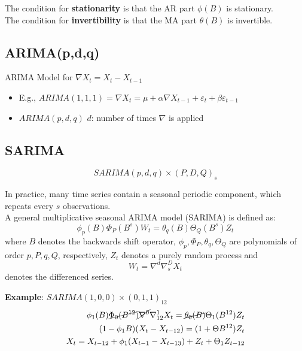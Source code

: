 The condition for \textbf{stationarity} is that the AR part $\phi(B)$ is stationary.\\
The condition for \textbf{invertibility} is that the MA part $\theta(B)$ is invertible.

\subsection{ARIMA(p,d,q)}

ARIMA Model for \(\nabla X_t=X_t-X_{t-1}\)
\begin{itemize}
    \item[] E.g., \( ARIMA(1,1,1)=\nabla X_t=\mu +\alpha \nabla X_{t-1} + \varepsilon_t + \beta \varepsilon_{t-1} \)
    \item $ARIMA(p,d,q)$ \quad $d$: number of times $\nabla$ is applied
\end{itemize}

\subsection{SARIMA}

\[SARIMA(p,d,q) \times (P,D,Q)_s\]

In practice, many time series contain a seasonal periodic component, which repeats every $s$ observations. \\

A general multiplicative seasonal ARIMA model (SARIMA) is defined as: \[
\phi_p(B) \Phi_P(B^s)W_t = \theta_q(B)\Theta_Q(B^s)Z_t 
\]
where $B$ denotes the backwards shift operator, $\phi_p, \Phi_P, \theta_q, \Theta_Q$ are polynomials of order $p,P,q,Q$, respectively, $Z_t$ denotes a purely random process and \[ W_t=\nabla^d \nabla^D_s X_t \] denotes the differenced series.

\textbf{Example}: $SARIMA(1,0,0)\times(0,1,1)_{12}$
\begin{align*}
    \phi_1(B) \cancel{\Phi_0(B^{12})} \cancel{\nabla^0} \nabla^1_{12} X_t = \cancel{\theta_0(B)}\Theta_1(B^{12})Z_t \\
    (1-\phi_1 B)(X_t-X_{t-12})=(1+\Theta B^{12})Z_t \\
    X_t = X_{t-12} + \phi_1(X_{t-1}-X_{t-13}) + Z_t + \Theta_1 Z_{t-12}
\end{align*}

